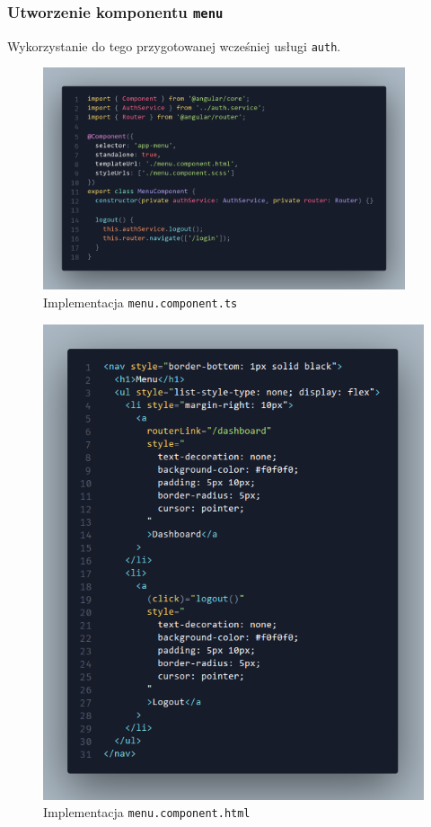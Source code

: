 \documentclass[12pt]{article}
\begin{document}
\subsubsection{Utworzenie komponentu \texttt{menu}}
Wykorzystanie do tego przygotowanej wcześniej usługi \texttt{auth}.
\begin{figure}[H]
  \centering
  \includegraphics[width=0.95\textwidth,keepaspectratio]{image-15.png}
  \caption{Implementacja \texttt{menu.component.ts}}
  \label{fig:image-15}
\end{figure}
\begin{figure}[H]
  \centering
  \includegraphics[width=1\textwidth,keepaspectratio]{image-16.png}
  \caption{Implementacja \texttt{menu.component.html}}
  \label{fig:image-16}
\end{figure}
\end{document}
